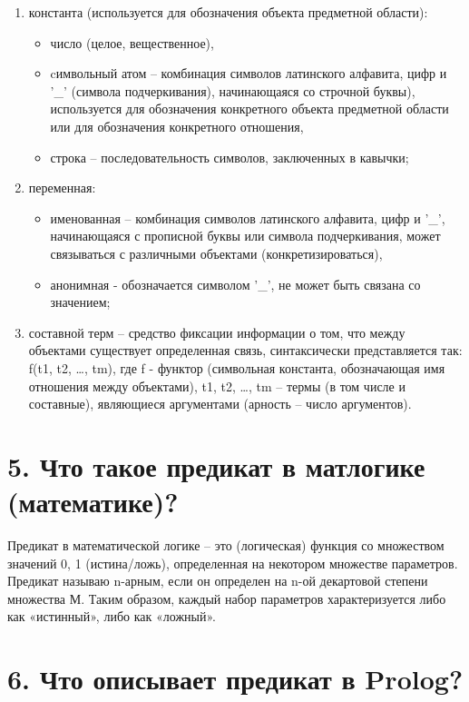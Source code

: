 \documentclass[12pt]{report}
\begin{document}
\begin{enumerate}
	\item константа (используется для обозначения объекта предметной области): 
	\begin{itemize}
		\item число (целое, вещественное),
		\item cимвольный атом -- комбинация символов латинского алфавита, цифр и ’\_’ (символа подчеркивания), начинающаяся со строчной буквы), используется для обозначения конкретного объекта предметной области или для обозначения конкретного отношения,
		\item строка -- последовательность символов, заключенных в кавычки;
	\end{itemize}
	\item переменная:
	\begin{itemize}
		\item именованная -- комбинация символов латинского алфавита, цифр и ’\_’, начинающаяся с прописной буквы или символа подчеркивания, может связываться с различными объектами (конкретизироваться),
		\item анонимная  - обозначается символом ’\_’, не может быть связана со значением;
	\end{itemize}
	\item составной терм -- средство фиксации информации о том, что между объектами существует определенная связь,  синтаксически представляется так: f(t1, t2, …, tm), где f -  функтор (символьная константа, обозначающая имя отношения между объектами), t1, t2, …, tm – термы (в том  числе  и составные), являющиеся аргументами (арность -- число аргументов).
\end{enumerate}

\section*{5. Что такое предикат в матлогике (математике)?}

Предикат в математической логике -- это (логическая) функция со множеством значений {0, 1} (истина/ложь), определенная на некотором множестве параметров. Предикат называю n-арным, если он определен на n-ой декартовой степени множества М. Таким образом, каждый набор параметров характеризуется либо как «истинный», либо как «ложный».

\section*{6. Что описывает предикат в Prolog?}
\end{document}
